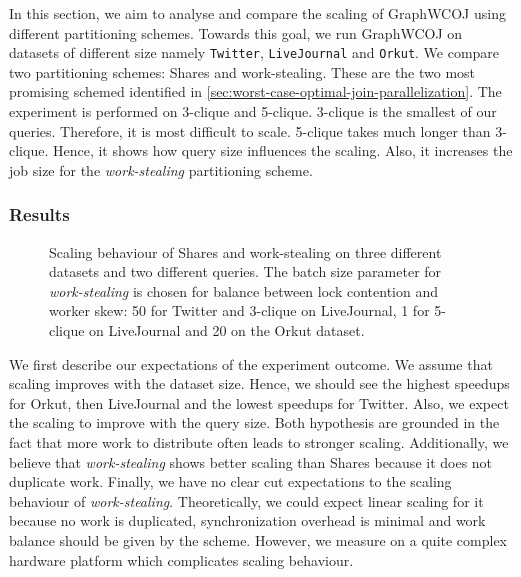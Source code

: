 In this section, we aim to analyse and compare the scaling of Graph\textsc{WCOJ} using different
partitioning schemes.
Towards this goal, we run Graph\textsc{WCOJ} on datasets of different size namely \texttt{Twitter},
\texttt{LiveJournal} and \texttt{Orkut}.
We compare two partitioning schemes: Shares and work-stealing.
These are the two most promising schemed identified in \cref{sec:worst-case-optimal-join-parallelization}.
The experiment is performed on 3-clique and 5-clique.
3-clique is the smallest of our queries.
Therefore, it is most difficult to scale.
5-clique takes much longer than 3-clique.
Hence, it shows how query size influences the scaling.
Also, it increases the job size for the \textit{work-stealing} partitioning scheme.


\subsubsection{Results}

\begin{figure}
    \centering
    \newline
    \caption{Scaling behaviour of Shares and work-stealing on three different datasets
      and two different queries.
      The batch size parameter for \textit{work-stealing} is chosen for balance between lock contention and worker skew:
      50 for Twitter and 3-clique on LiveJournal, 1 for 5-clique on LiveJournal and 20 on the Orkut dataset.
    }
    \label{fig:graphWCOJ-scaling}
\end{figure}

We first describe our expectations of the experiment outcome.
We assume that scaling improves with the dataset size.
Hence, we should see the highest speedups for Orkut, then LiveJournal and the lowest speedups for Twitter.
Also, we expect the scaling to improve with the query size.
Both hypothesis are grounded in the fact that more work to distribute often leads to stronger scaling.
Additionally, we believe that \textit{work-stealing} shows better scaling than Shares because it does not duplicate work.
Finally, we have no clear cut expectations to the scaling behaviour of \textit{work-stealing}.
Theoretically, we could expect linear scaling for it because no work is duplicated, synchronization overhead is minimal and
work balance should be given by the scheme.
However, we measure on a quite complex hardware platform which complicates scaling behaviour.

